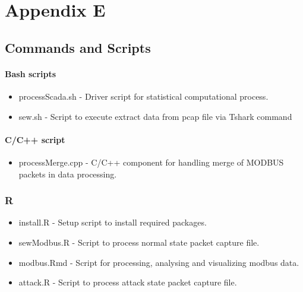 \documentclass[12pt,]{article}
\begin{document}
\section*{Appendix E}\label{appendix-e}

\subsection*{Commands and Scripts}\label{commands-and-scripts}

\paragraph{Bash scripts}\label{bash-scripts}

\begin{itemize}
\itemsep1pt\parskip0pt
\item
  processScada.sh - Driver script for statistical computational process.
\item
  sew.sh - Script to execute extract data from pcap file via Tshark
  command
\end{itemize}

\paragraph{C/C++ script}\label{cc-script}

\begin{itemize}
\itemsep1pt\parskip0pt
\item
  processMerge.cpp - C/C++ component for handling merge of MODBUS
  packets in data processing.
\end{itemize}

\subsubsection{R}\label{r}

\begin{itemize}
\itemsep1pt\parskip0pt
\item
  install.R - Setup script to install required packages.
\item
  sewModbus.R - Script to process normal state packet capture file.
\item
  modbus.Rmd - Script for processing, analysing and visualizing modbus
  data.
\item
  attack.R - Script to process attack state packet capture file.
\end{itemize}
\end{document}
